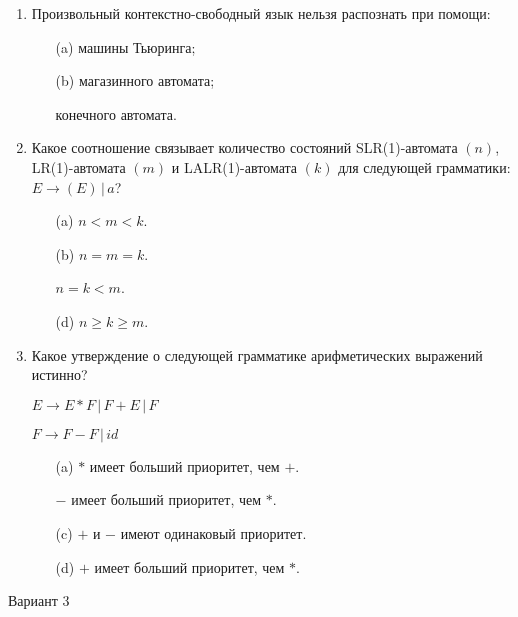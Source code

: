 \documentclass[12pt]{article}
\begin{document}
\begin{enumerate}
    \item Произвольный контекстно-свободный язык нельзя распознать при помощи:
    \begin{enumerate}
        \item[(a)] машины Тьюринга;
        \item[(b)] магазинного автомата;
        \item[\Checkmark] конечного автомата.
    \end{enumerate}
    
    \item Какое соотношение связывает количество состояний SLR(1)-автомата $(n)$, LR(1)-автомата $(m)$ и LALR(1)-автомата $(k)$ для следующей грамматики: $E \rightarrow (E) \, | \, a$?
    \begin{enumerate}
        \item[(a)] $n < m < k$.
        \item[(b)] $n = m = k$.
        \item[\Checkmark] $n = k < m$.
        \item[(d)] $n \geq k \geq m$.
    \end{enumerate}
    
    \item Какое утверждение о следующей грамматике арифметических выражений истинно?

$E \rightarrow E * F \, | \, F + E \, | \, F$

$F \rightarrow F - F \, | \, id $
    \begin{enumerate}
        \item[(a)] $*$ имеет больший приоритет, чем $+$.
        \item[\Checkmark] $-$ имеет больший приоритет, чем $*$.
        \item[(c)] $+$ и $-$ имеют одинаковый приоритет.
        \item[(d)] $+$ имеет больший приоритет, чем $*$.
    \end{enumerate}
\end{enumerate}

\newpage

{\Large Вариант 3}
\medskip
\end{document}
